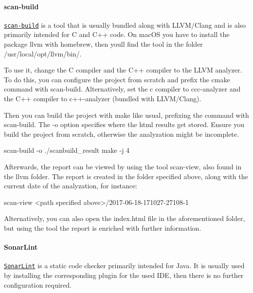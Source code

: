 \paragraph*{scan-\/build}

\href{http://clang-analyzer.llvm.org/scan-build.html}{\tt scan-\/build} is a tool that is usually bundled along with L\+L\+V\+M/\+Clang and is also primarily intended for C and C++ code. On mac\+OS you have to install the package {\ttfamily llvm} with homebrew, then you\textquotesingle{}ll find the tool in the folder {\ttfamily /usr/local/opt/llvm/bin/}.

To use it, change the C compiler and the C++ compiler to the L\+L\+VM analyzer. To do this, you can configure the project from scratch and prefix the cmake command with {\ttfamily scan-\/build}. Alternatively, set the c compiler to {\ttfamily ccc-\/analyzer} and the C++ compiler to {\ttfamily c++-\/analyzer} (bundled with L\+L\+V\+M/\+Clang).

Then you can build the project with {\ttfamily make} like usual, prefixing the command with {\ttfamily scan-\/build}. The {\ttfamily -\/o} option specifies where the html results get stored. Ensure you build the project from scratch, otherwise the analyzation might be incomplete. \begin{DoxyVerb}scan-build -o ./scanbuild_result make -j 4
\end{DoxyVerb}


Afterwards, the report can be viewed by using the tool {\ttfamily scan-\/view}, also found in the llvm folder. The report is created in the folder specified above, along with the current date of the analyzation, for instance\+: \begin{DoxyVerb}scan-view <path specified above>/2017-06-18-171027-27108-1
\end{DoxyVerb}


Alternatively, you can also open the {\ttfamily index.\+html} file in the aforementioned folder, but using the tool the report is enriched with further information.

\paragraph*{Sonar\+Lint}

\href{http://www.sonarlint.org/}{\tt Sonar\+Lint} is a static code checker primarily intended for Java. It is usually used by installing the corresponding plugin for the used I\+DE, then there is no further configuration required.

